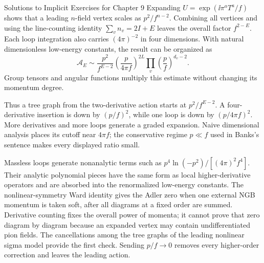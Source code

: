 \begin{bankssolutions}{Solutions to Implicit Exercises for Chapter 9}
Expanding $U=\exp(\ii\pi^aT^a/f)$ shows that a leading $n$-field vertex scales
as $p^2/f^{n-2}$.  Combining all vertices and using the line-counting identity
$\sum_vn_v=2I+E$ leaves the overall factor $f^{2-E}$.  Each loop integration
also carries $(4\pi)^{-2}$ in four dimensions.  With natural dimensionless
low-energy constants, the result can be organized as
\[
  \mathcal A_E\sim\frac{p^2}{f^{E-2}}
  \left(\frac{p}{4\pi f}\right)^{2L}
  \prod_v\left(\frac{p}{f}\right)^{d_v-2}.
\]
Group tensors and angular functions multiply this estimate without changing
its momentum degree.

Thus a tree graph from the two-derivative action starts at
$p^2/f^{E-2}$.  A four-derivative insertion is down by $(p/f)^2$, while one
loop is down by $(p/4\pi f)^2$.  More derivatives and more loops generate a
graded expansion.  Naive dimensional analysis places its cutoff near
$4\pi f$; the conservative regime $p\ll f$ used in Banks's sentence makes
every displayed ratio small.

Massless loops generate nonanalytic terms such as
$p^4\ln(-p^2)/[(4\pi)^2f^4]$.  Their analytic polynomial pieces have the same
form as local higher-derivative operators and are absorbed into the
renormalized low-energy constants.  The nonlinear-symmetry Ward identity gives
the Adler zero when one external NGB momentum is taken soft, after all diagrams
at a fixed order are summed.  Derivative counting fixes the overall power of
momenta; it cannot prove that zero diagram by diagram because an expanded
vertex may contain undifferentiated pion fields.  The cancellations among the
tree graphs of the leading nonlinear sigma model provide the first check.
Sending $p/f\to0$ removes every higher-order correction and leaves the leading
action.

\end{bankssolutions}
